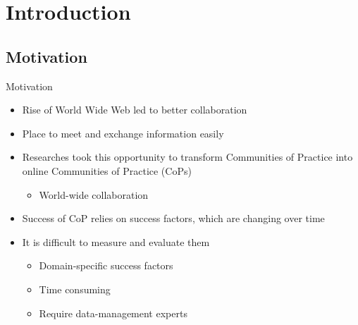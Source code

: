 \section{Introduction}

\subsection{Motivation}

\begin{frame}{Motivation}
  \begin{itemize}
    \item Rise of World Wide Web led to better collaboration
    \item Place to meet and exchange information easily
    \item Researches took this opportunity to transform Communities of Practice into online Communities of Practice (CoPs)
          \begin{itemize}
            \item World-wide collaboration
          \end{itemize}
    \item Success of CoP relies on success factors, which are changing over time
    \item It is difficult to measure and evaluate them
          \begin{itemize}
            \item Domain-specific success factors
            \item Time consuming
            \item Require data-management experts %
          \end{itemize}
  \end{itemize}
\end{frame}


